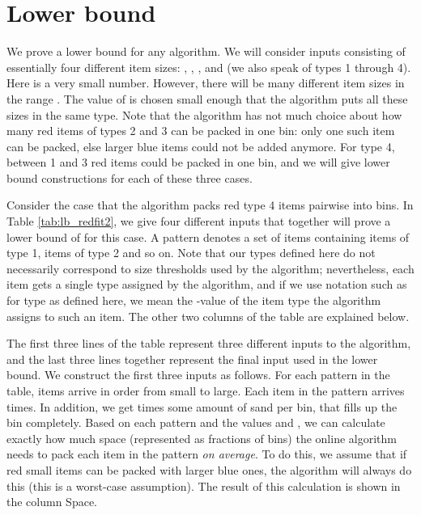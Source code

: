 \section{Lower bound}
We prove a lower bound for any \EHarm{} algorithm.
We will consider inputs consisting of essentially four different item sizes: , , , and  (we also speak of types 1 through 4). Here  is a very small number. However, there will be many different item sizes in the range
.
The value of  is chosen small enough that the algorithm puts all these sizes in the same type.
Note that the algorithm has not much choice about how many red items of types 2 and 3 can be packed in one bin: only one such item can be packed, else larger blue items could not be added anymore. For type 4, between 1 and 3 red items could be packed in one bin, and we will give lower bound constructions for each of these three cases.

Consider the case that the algorithm packs red type 4 items pairwise into bins. In Table \ref{tab:lb_redfit2}, we give four different inputs that together will prove a lower bound of \finallb{} for this case. A pattern  denotes a set of items containing  items of type 1,  items of type 2 and so on. 
Note that our types defined here do not necessarily correspond to size thresholds used by the algorithm; nevertheless, each item gets a single type assigned by the algorithm, and if we use notation such as  for type  as defined here, we mean the -value of the item type the algorithm assigns to such an item.
The other two columns of the table are explained below.

\begin{table}[t]
	\caption{Inputs for lower bound  in case .}
	\label{tab:lb_redfit2}
	\centering
\end{table}

The first three lines of the table represent three different inputs to the algorithm, and the last three lines together represent the final input used in the lower bound.
We construct the first three inputs as follows. For each pattern in the table, 
items arrive in order from small to large. Each item in the pattern arrives  times. In addition, we get  times some amount of sand per bin, that fills up the bin completely. 
Based on each pattern and the values  and , we can calculate exactly how much space (represented as fractions of bins) the online algorithm needs to pack each item in the pattern \emph{on average}. 
To do this, we assume that if red small items can be packed with larger 
blue ones, the algorithm will always do this (this is a worst-case assumption).
The result of this calculation is shown in the column Space.



